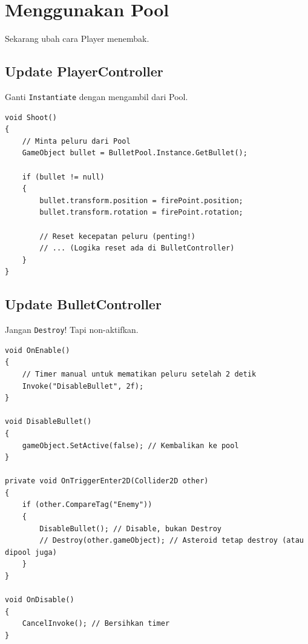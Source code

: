 
\section{Menggunakan Pool}

Sekarang ubah cara Player menembak.

\subsection{Update PlayerController}
Ganti \texttt{Instantiate} dengan mengambil dari Pool.

\begin{lstlisting}[language={[Sharp]C}]
void Shoot()
{
    // Minta peluru dari Pool
    GameObject bullet = BulletPool.Instance.GetBullet();
    
    if (bullet != null)
    {
        bullet.transform.position = firePoint.position;
        bullet.transform.rotation = firePoint.rotation;
        
        // Reset kecepatan peluru (penting!)
        // ... (Logika reset ada di BulletController)
    }
}
\end{lstlisting}

\subsection{Update BulletController}
Jangan \texttt{Destroy}! Tapi non-aktifkan.

\begin{lstlisting}[language={[Sharp]C}]
void OnEnable()
{
    // Timer manual untuk mematikan peluru setelah 2 detik
    Invoke("DisableBullet", 2f);
}

void DisableBullet()
{
    gameObject.SetActive(false); // Kembalikan ke pool
}

private void OnTriggerEnter2D(Collider2D other)
{
    if (other.CompareTag("Enemy"))
    {
        DisableBullet(); // Disable, bukan Destroy
        // Destroy(other.gameObject); // Asteroid tetap destroy (atau dipool juga)
    }
}

void OnDisable()
{
    CancelInvoke(); // Bersihkan timer
}
\end{lstlisting}
